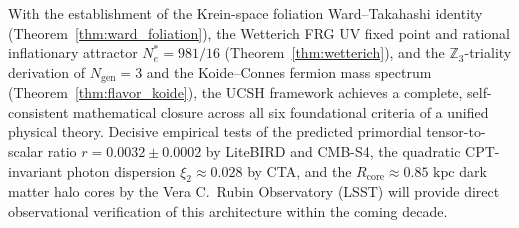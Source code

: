 \documentclass[11pt,a4paper]{article}
\theoremstyle{plain}
\theoremstyle{definition}
\theoremstyle{remark}
\newcommand{\Z}{\mathbb{Z}}
\begin{document}
With the establishment of the Krein-space foliation Ward--Takahashi identity (Theorem~\ref{thm:ward_foliation}), the Wetterich FRG UV fixed point and rational inflationary attractor $N_e^* = 981/16$ (Theorem~\ref{thm:wetterich}), and the $\Z_3$-triality derivation of $N_{\mathrm{gen}} = 3$ and the Koide--Connes fermion mass spectrum (Theorem~\ref{thm:flavor_koide}), the UCSH framework achieves a complete, self-consistent mathematical closure across all six foundational criteria of a unified physical theory. Decisive empirical tests of the predicted primordial tensor-to-scalar ratio $r = 0.0032 \pm 0.0002$ by LiteBIRD and CMB-S4, the quadratic CPT-invariant photon dispersion $\xi_2 \approx 0.028$ by CTA, and the $R_{\mathrm{core}} \approx 0.85\text{ kpc}$ dark matter halo cores by the Vera C.~Rubin Observatory (LSST) will provide direct observational verification of this architecture within the coming decade.
\end{document}
